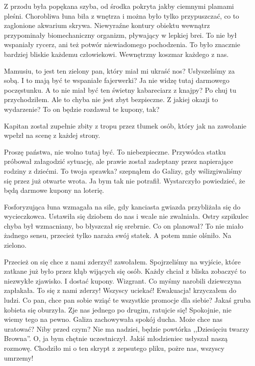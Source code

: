 Z przodu była popękana szyba, od środka pokryta jakby ciemnymi plamami pleśni.
Chorobliwa łuna biła z wnętrza i można było tylko przypuszczać, co to zaglonione akwarium skrywa.
Niewyraźne kontury obiektu wewnątrz przypominały biomechaniczny organizm, pływający w lepkiej brei.
To nie był wspaniały rycerz, ani też potwór niewiadomego pochodzenia. 
To było znacznie bardziej bliskie każdemu człowiekowi.
Wewnętrzny koszmar każdego z nas.

\begin{dialogue}
	\ds{} Mamusiu, to jest ten zielony pan, który miał mi ukraść nos? \dm{} Usłyszeliśmy za sobą.
	\ds{} I to mają być te wspaniałe fajerwerki?
	\ds{} Ja nie widzę tutaj darmowego poczęstunku.
	\ds{} A to nie miał być ten świetny kabareciarz z knajpy?
	\ds{} Po chuj tu przychodziłem.
	\ds{} Ale to chyba nie jest zbyt bezpieczne.
	\ds{} Z jakiej okazji to wydarzenie?
	\ds{} To on będzie rozdawał te kupony, tak?
\end{dialogue}

Kapitan został zupełnie zbity z tropu przez tłumek osób, który jak na zawołanie wpełzł na scenę z każdej strony.

\begin{dialogue}
	\dm{} Proszę państwa, nie wolno tutaj być. To niebezpieczne. \dm{} Przywódca statku próbował załagodzić sytuację, ale prawie został zadeptany przez napierające rodziny z dziećmi.
	\ds{} To twoja sprawka? \dm{} szepnąłem do Galizy, gdy wślizgiwaliśmy się przez już otwarte wrota. \dm{} Ja bym tak nie potrafił.
	\ds{} Wystarczyło powiedzieć, że będą darmowe kupony na loterię. 
\end{dialogue}

Fosforyzująca łuna wzmagała na sile, gdy kanciasta gwiazda przybliżała się do wycieczkowca.
Ustawiła się dziobem do nas i wcale nie zwalniała.
Ostry szpikulec chyba był wzmacniany, bo błyszczał się srebrnie.
Co on planował? To nie miało żadnego sensu, przecież tylko naraża swój statek.
A potem mnie olśniło. Na zielono.

\begin{dialogue}
	\ds{} Przecież on się chce z nami zderzyć! \dm{} zawołałem. Spojrzeliśmy na wyjście, które zatkane już było przez kłąb wijących się osób. Każdy chciał z bliska zobaczyć to niezwykłe zjawisko. I dostać kupony.
	\ds{} Wizgrant. Co myśmy narobili \dm{} dziewczyna zapłakała.
	\ds{} To się z nami zderzy! Wszyscy uciekać! Ewakuacja! \dm{} krzyczałem do ludzi.
	\ds{} Co pan, chce pan sobie wziąć te wszystkie promocje dla siebie? \dm{} Jakaś gruba kobieta się oburzyła.
	\ds{} Zje nas jednego po drugim, ratujcie się!
	\ds{} Spokojnie, nie wiemy tego na pewno. \dm{} Galiza zachowywała spokój ducha. \dm{} Może chce nas uratować?
	\ds{} Niby przed czym? Nie ma nadziei, będzie powtórka ,,Dziesięciu twarzy Browna''.
	\ds{} O, ja bym chętnie uczestniczył. \dm{} Jakiś młodzieniec usłyszał naszą rozmowę.
	\ds{} Chodziło mi o ten skrypt z zepsutego pliku, pożre nas, wszyscy umrzemy!
\end{dialogue}

